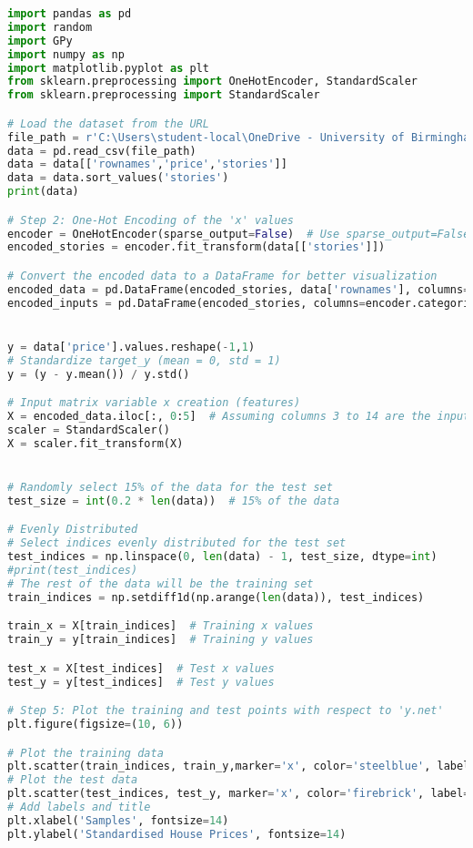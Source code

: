 \documentclass[12pt,a4paper]{article}
\begin{document}
\vspace{10pt}
\begin{lstlisting}[language=python, caption={Code of the Creation of Figure \ref{fig:SE-ARD categorical plots}}]
import pandas as pd
import random
import GPy
import numpy as np
import matplotlib.pyplot as plt
from sklearn.preprocessing import OneHotEncoder, StandardScaler
from sklearn.preprocessing import StandardScaler

# Load the dataset from the URL
file_path = r'C:\Users\student-local\OneDrive - University of Birmingham\Dissertation\HousePrices.csv'
data = pd.read_csv(file_path)
data = data[['rownames','price','stories']]
data = data.sort_values('stories')
print(data)

# Step 2: One-Hot Encoding of the 'x' values
encoder = OneHotEncoder(sparse_output=False)  # Use sparse_output=False for dense array
encoded_stories = encoder.fit_transform(data[['stories']])

# Convert the encoded data to a DataFrame for better visualization
encoded_data = pd.DataFrame(encoded_stories, data['rownames'], columns=encoder.categories_[0])
encoded_inputs = pd.DataFrame(encoded_stories, columns=encoder.categories_[0])


y = data['price'].values.reshape(-1,1)
# Standardize target_y (mean = 0, std = 1)
y = (y - y.mean()) / y.std()

# Input matrix variable x creation (features)
X = encoded_data.iloc[:, 0:5]  # Assuming columns 3 to 14 are the input features
scaler = StandardScaler()
X = scaler.fit_transform(X)


# Randomly select 15% of the data for the test set
test_size = int(0.2 * len(data))  # 15% of the data

# Evenly Distributed
# Select indices evenly distributed for the test set
test_indices = np.linspace(0, len(data) - 1, test_size, dtype=int)
#print(test_indices)
# The rest of the data will be the training set
train_indices = np.setdiff1d(np.arange(len(data)), test_indices)

train_x = X[train_indices]  # Training x values
train_y = y[train_indices]  # Training y values

test_x = X[test_indices]  # Test x values
test_y = y[test_indices]  # Test y values

# Step 5: Plot the training and test points with respect to 'y.net'
plt.figure(figsize=(10, 6))

# Plot the training data
plt.scatter(train_indices, train_y,marker='x', color='steelblue', label='Training Data', s=50)
# Plot the test data
plt.scatter(test_indices, test_y, marker='x', color='firebrick', label='Test Data', s=50)
# Add labels and title
plt.xlabel('Samples', fontsize=14)
plt.ylabel('Standardised House Prices', fontsize=14)


\end{lstlisting}
\end{document}
